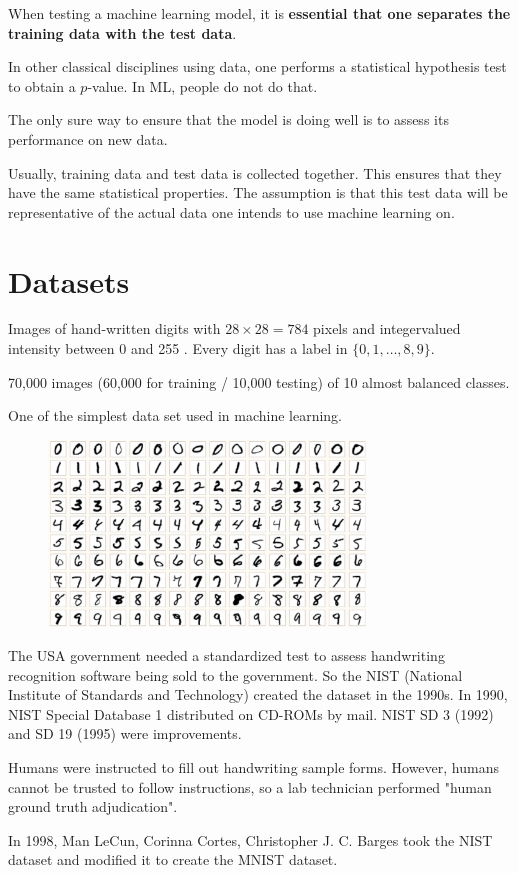 \begin{concept}
    When testing a machine learning model, it is \textbf{essential that one separates the training data with the test data}.

    In other classical disciplines using data, one performs a statistical hypothesis test to obtain a $p$-value. In ML, people do not do that.

    The only sure way to ensure that the model is doing well is to assess its performance on new data.

    Usually, training data and test data is collected together. This ensures that they have the same statistical properties. The assumption is that this test data will be representative of the actual data one intends to use machine learning on.
\end{concept}

\section{Datasets}

\begin{concept}[3.20][MNIST]
    Images of hand-written digits with $28 \times 28=784$ pixels and integervalued intensity between 0 and 255 . Every digit has a label in $\{0,1, \ldots, 8,9\}$.

    70,000 images (60,000 for training / 10,000 testing) of 10 almost balanced classes.

    One of the simplest data set used in machine learning.

    \begin{figure}[H]
        \centering
        \includegraphics[width=0.75\textwidth]{.././assets/3.3.png}
    \end{figure}

    The USA government needed a standardized test to assess handwriting recognition software being sold to the government. So the NIST (National Institute of Standards and Technology) created the dataset in the 1990s. In 1990, NIST Special Database 1 distributed on CD-ROMs by mail. NIST SD 3 (1992) and SD 19 (1995) were improvements.

    Humans were instructed to fill out handwriting sample forms. However, humans cannot be trusted to follow instructions, so a lab technician performed "human ground truth adjudication".

    In 1998, Man LeCun, Corinna Cortes, Christopher J. C. Barges took the NIST dataset and modified it to create the MNIST dataset.
\end{concept}


